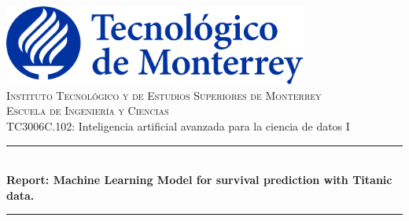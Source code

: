 \author{Francisco Salas Porras}
\begin{titlepage}

    \setlength{\multicolsep}{0pt}%
    \newcommand{\HRule}{\rule{\linewidth}{0.5mm}} %

    \centering
    \includegraphics[width=10cm]{Title/logoTec.png}\\[1cm]





    \textsc{\LARGE Instituto Tecnológico y de Estudios Superiores de Monterrey }\\[1 cm] %
    \textsc{\large Escuela de Ingeniería y Ciencias}\\[0.5cm] %
    \textrm{\Large TC3006C.102: Inteligencia artificial avanzada para la ciencia de datos I}\\[0.5cm]
    \makeatletter
    \HRule \\[0.4cm]
    { \LARGE \bfseries \@title \large Report: Machine Learning Model for survival prediction with Titanic data. }\\[0.4cm] %
    \HRule \\[0.6 cm]




\end{titlepage}
